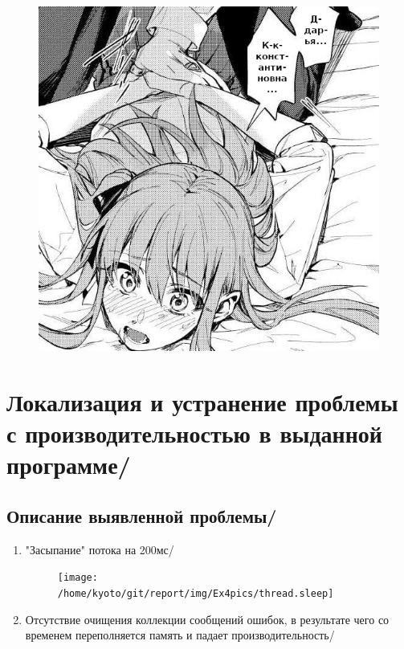 \newpage

\thispagestyle{empty}

\BgThispage

\begin{figure}[H]
    \centering
    \includegraphics[scale=0.7]{img/rape}
\end{figure}

\newpage

\thispagestyle{empty}

\BgThispage


\section{Локализация и устранение проблемы с производительностью в выданной программе/}

\subsection{Описание выявленной проблемы/}
\begin{enumerate}
    \item "Засыпание" потока на 200мс/
    \begin{figure}[h]
        \texttt{[image: /home/kyoto/git/report/img/Ex4pics/thread.sleep]}
    \end{figure}
    \item Отсутствие очищения коллекции сообщений ошибок, в результате чего со временем переполняется память и падает производительность/
\end{enumerate}

